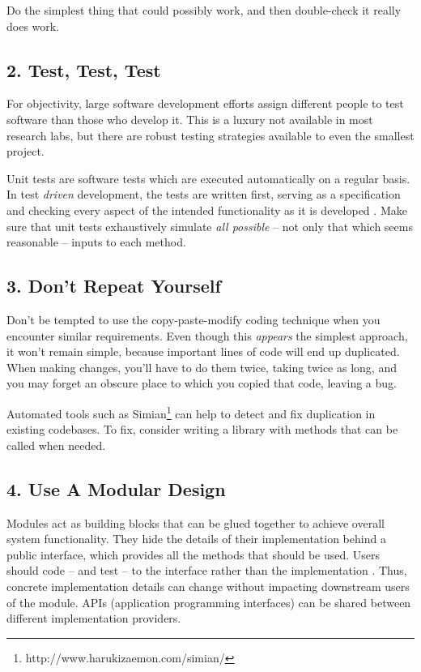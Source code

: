 \documentclass{bmcart}
\begin{document}
Do the simplest thing that could possibly work, and then double-check it really does work. 

\subsection*{2. Test, Test, Test}

For objectivity, large software development efforts assign different people to test software than those who develop it. This is a luxury not available in most research labs, but there are robust testing strategies available to even the smallest project. 

Unit tests are software tests which are executed automatically on a regular basis. In test \textit{driven} development, the tests are written first, serving as a specification and checking every aspect of the intended functionality as it is developed \cite{tdd}. Make sure that unit tests exhaustively simulate \textit{all possible} -- not only that which seems reasonable -- inputs to each method. 

\subsection*{3. Don't Repeat Yourself}

Don't be tempted to use the copy-paste-modify coding technique when you encounter similar requirements. Even though this \textit{appears} the simplest approach, it won't remain simple, because important lines of code will end up duplicated. When making changes, you'll have to do them twice, taking twice as long, and you may forget an obscure place to which you copied that code, leaving a bug. 

Automated tools such as Simian\footnote{http://www.harukizaemon.com/simian/} can help to detect and fix duplication in existing codebases. To fix, consider writing a library with methods that can be called when needed.  

\subsection*{4. Use A Modular Design}

Modules act as building blocks that can be glued together to achieve overall system functionality. They hide the details of their implementation behind a public interface, which provides all the methods that should be used. Users should code -- and test -- to the interface rather than the implementation \cite{effectivejava2008}. Thus, concrete implementation details can change without impacting downstream users of the module. APIs (application programming interfaces) can be shared between different implementation providers. 
\end{document}
